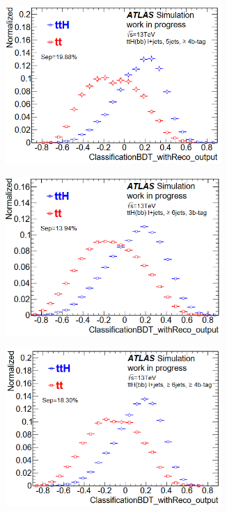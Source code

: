 \begin{figure}[t!]
\begin{subfigure}{0.5\textwidth}
  \centering
  \includegraphics[width=0.9\textwidth]{figures/ttH/bdt54.png}
  \caption{}
  \label{sec:obj:fig:beff}
\end{subfigure}
\begin{subfigure}{0.5\textwidth}
  \centering
  \includegraphics[width=0.9\textwidth]{figures/ttH/bdt63.png}
  \caption{}
  \label{sec:obj:fig:ceff}
\end{subfigure}
\begin{center}
\begin{subfigure}{0.5\textwidth}
  \centering
  \includegraphics[width=0.9\textwidth]{figures/ttH/bdt64.png}

\end{subfigure}
\end{center}
\end{figure}
